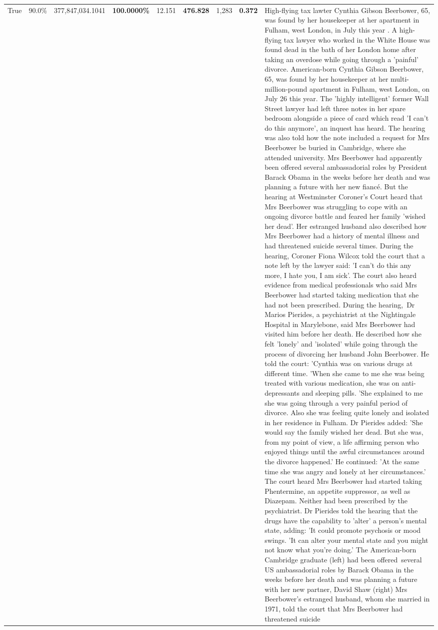 \begin{table}[H]
\begin{tabular}{lllrlllll}
\cline{1-9}
True & 90.0\% & 377,847,034.1041 & \bfseries \color{red} 100.0000\% & 12.151 & \bfseries \color{red} 476.828 & 1,283 & \bfseries \color{red} 0.372 & High-flying tax lawter Cynthia Gibson Beerbower, 65, was found by her housekeeper at her apartment in Fulham, west London, in July this year . A high-flying tax lawyer who worked in the White House was found dead in the bath of her London home after taking an overdose while going through a 'painful' divorce. American-born Cynthia Gibson Beerbower, 65, was found by her housekeeper at her multi-million-pound apartment in Fulham, west London, on July 26 this year. The 'highly intelligent' former Wall Street lawyer had left three notes in her spare bedroom alongside a piece of card which read 'I can't do this anymore', an inquest has heard. The hearing was also told how the note included a request for Mrs Beerbower be buried in Cambridge, where she attended university. Mrs Beerbower had apparently been offered several ambassadorial roles by President Barack Obama in the weeks before her death and was planning a future with her new fiancé. But the hearing at Westminster Coroner's Court heard that Mrs Beerbower was struggling to cope with an ongoing divorce battle and feared her family 'wished her dead'. Her estranged husband also described how Mrs Beerbower had a history of mental illness and had threatened suicide several times. During the hearing, Coroner Fiona Wilcox told the court that a note left by the lawyer said: 'I can't do this any more, I hate you, I am sick'. The court also heard evidence from medical professionals who said Mrs Beerbower had started taking medication that she had not been prescribed. During the hearing, Dr Marios Pierides, a psychiatrist at the Nightingale Hospital in Marylebone, said Mrs Beerbower had visited him before her death. He described how she felt 'lonely' and 'isolated' while going through the process of divorcing her husband John Beerbower. He told the court: 'Cynthia was on various drugs at different time. 'When she came to me she was being treated with various medication, she was on anti-depressants and sleeping pills. 'She explained to me she was going through a very painful period of divorce. Also she was feeling quite lonely and isolated in her residence in Fulham. Dr Pierides added: 'She would say the family wished her dead. But she was, from my point of view, a life affirming person who enjoyed things until the awful circumstances around the divorce happened.' He continued: 'At the same time she was angry and lonely at her circumstances.' The court heard Mrs Beerbower had started taking Phentermine, an appetite suppressor, as well as Diazepam. Neither had been prescribed by the psychiatrist. Dr Pierides told the hearing that the drugs have the capability to 'alter' a person's mental state, adding: 'It could promote psychosis or mood swings. 'It can alter your mental state and you might not know what you're doing.' The American-born Cambridge graduate (left) had been offered several US ambassadorial roles by Barack Obama in the weeks before her death and was planning a future with her new partner, David Shaw (right) Mrs Beerbower's estranged husband, whom she married in 1971, told the court that Mrs Beerbower had threatened suicide 
\end{tabular}
\end{table}
